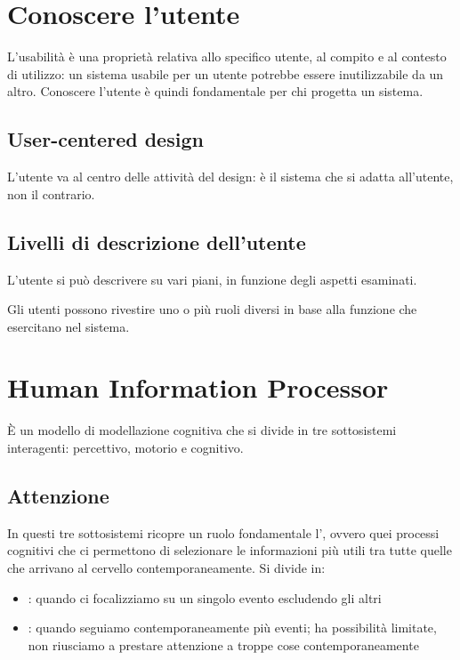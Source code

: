 \section{Conoscere l'utente}

L'usabilità è una proprietà relativa allo specifico utente, al compito e al contesto di utilizzo: un sistema usabile per un utente potrebbe essere inutilizzabile da un altro. Conoscere l'utente è quindi fondamentale per chi progetta un sistema.

\subsection{User-centered design}

L'utente va al centro delle attività del design: è il sistema che si adatta all'utente, non il contrario.

\subsection{Livelli di descrizione dell'utente}

L'utente si può descrivere su vari piani, in funzione degli aspetti esaminati.

Gli utenti possono rivestire uno o più ruoli diversi in base alla funzione che esercitano nel sistema.


\section{Human Information Processor}

È un modello di modellazione cognitiva che si divide in tre sottosistemi interagenti: percettivo, motorio e cognitivo.

\subsection{Attenzione}

In questi tre sottosistemi ricopre un ruolo fondamentale l', ovvero quei processi cognitivi che ci permettono di selezionare le informazioni più utili tra tutte quelle che arrivano al cervello contemporaneamente. Si divide in:

\begin{itemize}
    \item {}: quando ci focalizziamo su un singolo evento escludendo gli altri
    \item {}: quando seguiamo contemporaneamente più eventi; ha possibilità limitate, non riusciamo a prestare attenzione a troppe cose contemporaneamente
\end{itemize}

